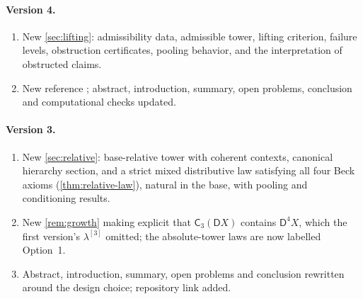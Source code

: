 \documentclass[11pt]{article}
\theoremstyle{definition}
\theoremstyle{remark}
\newcommand{\D}{\mathsf{D}}
\newcommand{\C}{\mathsf{C}}
\begin{document}
\paragraph{Version 4.}
\begin{enumerate}[leftmargin=*,label=(\alph*)]
\item New \cref{sec:lifting}: admissibility data, admissible tower, lifting criterion, failure levels,
  obstruction certificates, pooling behavior, and the interpretation of obstructed claims.
\item New reference \cite{Schrijver1986}; abstract, introduction, summary, open problems, conclusion
  and computational checks updated.
\end{enumerate}

\paragraph{Version 3.}
\begin{enumerate}[leftmargin=*,label=(\alph*)]
\item New \cref{sec:relative}: base-relative tower with coherent contexts, canonical hierarchy
  section, and a strict mixed distributive law satisfying all four Beck axioms
  (\cref{thm:relative-law}), natural in the base, with pooling and conditioning results.
\item New \cref{rem:growth} making explicit that $\C_3(\D X)$ contains $\D^4X$, which the first
  version's $\lambda^{[3]}$ omitted; the absolute-tower laws are now labelled Option~1.
\item Abstract, introduction, summary, open problems and conclusion rewritten around the design
  choice; repository link added.
\end{enumerate}
\end{document}
